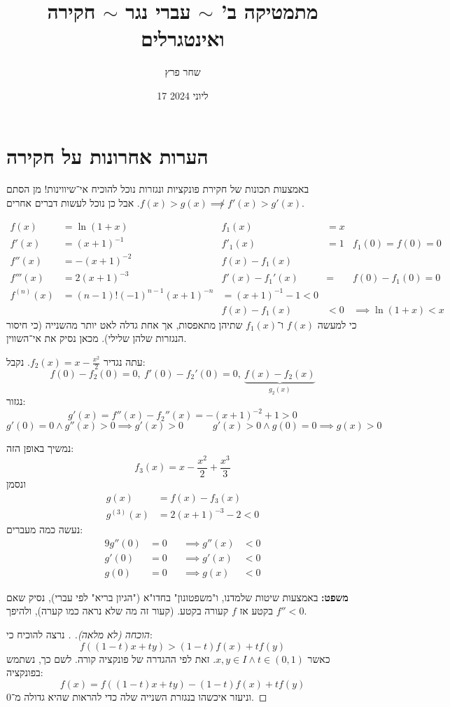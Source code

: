 \documentclass[]{article}
\author{שחר פרץ}
\title{מתמטיקה ב' $\sim$ עברי נגר $\sim$ חקירה ואינטגרלים}
\date{17 ליוני 2024}
\newcommand\op    {^{-1}}
\begin{document}
	\maketitle
	\section{הערות אחרונות על חקירה}
	באמצעות תכונות של חקירת פונקציות ונגזרות נוכל להוכיח אי־שיווינות! מן הסתם $f(x) > g(x) \not\implies f'(x) > g'(x)$. אבל כן נוכל לעשות דברים אחרים. 
	
	\begin{align}
		f(x) &= \ln(1 + x) & f_1(x) &= x\\
		f'(x) &= (x + 1) \op & f'_1(x) &= 1 & f_1(0) = f(0) = 0\\
		f''(x) &= -(x + 1) ^{-2} & f(x) - f_1(x) \\
		f'''(x) &= 2(x + 1) ^{-3} &f'(x) - f_1'(x) &= & f(0) - f_1(0) = 0\\
		f^{(n)}(x) &= (n - 1)!(-1)^{n - 1}(x + 1)^{-n}  &=(x + 1)\op - 1 < 0 \\
		\ && f(x) - f_1(x) &< 0 &\implies \ln(1 + x) < x
	\end{align}
	כי למעשה $f(x)$ ו־$f_1(x)$ שתיהן מתאפסות, אך אחת גדלה לאט יותר מהשנייה (כי חיסור הנגזרות שלהן שלילי). מכאן נסיק את אי־השווין. 
	
	עתה נגדיר $f_2(x) = x - \frac{x^2}{2}$. נקבל: 
	\[ f(0) - f_2(0) = 0, \ f'(0) - f_2'(0) = 0, \ \underbrace{f(x) - f_2(x)}_{g_2(x)} \]
	נגזור: 
	\[ g'(x) = f''(x) - f_2''(x) = -(x + 1)^{-2} + 1 > 0 \]
	\[ g'(0) = 0 \land g''(x) >0 \implies g'(x) > 0 \quad \quad \quad g'(x) > 0 \land g(0) = 0 \implies g(x) > 0 \]
	
	נמשיך באופן הזה: 
	\[ f_3(x) = x - \frac{x^2}{2} + \frac{x^3}{3} \]
	ונסמן
	\begin{align}
		g(x) &= f(x) - f_3(x) \\
		g^{(3)}(x) &= 2(x + 1)^{-3} - 2 < 0
	\end{align}
	נעשה כמה מעברים: 
	\begin{alignat}{9}
		g''(0) &= 0 && \implies g''(x) &< 0 \\
		g'(0) &= 0 && \implies g'(x) &< 0 \\
		g(0) &= 0 &&\implies g(x) &< 0
	\end{alignat}
	
	\textbf{משפט: }באמצעות שיטות שלמדנו, ו"משפטונון" בחדו"א ("הגיון בריא" לפי עברי), נסיק שאם $f'' < 0$ בקטע אז $f$ קעורה בקטע. (קעור זה מה שלא נראה כמו קערה), ולהיפך. 
	
	\begin{proof}[הוכחה (לא מלאה). ]
		נרצה להוכיח כי: 
		\[ f((1 - t)x + ty) > (1 - t) f(x) + tf(y) \]
		כאשר $x, y \in I \land t \in (0, 1)$. זאת לפי ההגדרה של פונקציה קורה. לשם כך, נשתמש בפונקציה: 
		\[ f(x) = f((1 - t)x + ty) - (1 - t) f(x) + tf(y) \]
		וניעזר איכשהו בנגזרת השנייה שלה כדי להראות שהיא גדולה מ־0. 
	\end{proof}
	
\end{document}
